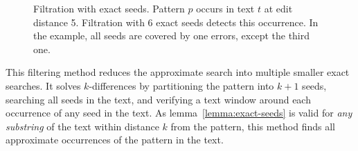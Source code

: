 \begin{figure}[h]
\begin{center}
\caption[Filtration with exact seeds]{Filtration with exact seeds. Pattern $p$ occurs in text $t$ at edit distance 5. Filtration with 6 exact seeds detects this occurrence. In the example, all seeds are covered by one errors, except the third one.}
\label{fig:seeds-ext}

\end{center}
\end{figure}

This filtering method reduces the approximate search into multiple smaller exact searches.
It solves $k$-differences by partitioning the pattern into $k+1$ seeds, searching all seeds in the text, and verifying a text window around each occurrence of any seed in the text.
As lemma~\ref{lemma:exact-seeds} is valid for \emph{any substring} of the text within distance $k$ from the pattern, this method finds all approximate occurrences of the pattern in the text.


